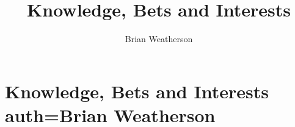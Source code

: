 \documentclass[oneside]{book}
\title{Knowledge, Bets and Interests}
\author{Brian Weatherson}
\begin{document}



\setcounter{paper}{0}

\chapter[Knowledge, Bets and Interests]{Knowledge, Bets and Interests auth=Brian Weatherson}







%



\end{document}
